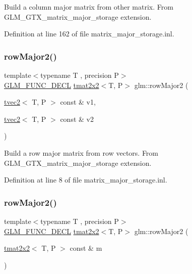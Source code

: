 Build a column major matrix from other matrix. From G\+L\+M\+\_\+\+G\+T\+X\+\_\+matrix\+\_\+major\+\_\+storage extension. 

Definition at line 162 of file matrix\+\_\+major\+\_\+storage.\+inl.

\mbox{\label{group__gtx__matrix__major__storage_ga0c7f4d56a85865f0002127119ab7d551}} 
\subsubsection{\texorpdfstring{rowMajor2()}{rowMajor2()}\hspace{0.1cm}{\footnotesize\ttfamily [1/2]}}
{\footnotesize\ttfamily template$<$typename T , precision P$>$ \\
\mbox{\hyperlink{setup_8hpp_ab2d052de21a70539923e9bcbf6e83a51}{G\+L\+M\+\_\+\+F\+U\+N\+C\+\_\+\+D\+E\+CL}} \mbox{\hyperlink{structglm_1_1tmat2x2}{tmat2x2}}$<$T, P$>$ glm\+::row\+Major2 (\begin{DoxyParamCaption}\item[{\mbox{\hyperlink{structglm_1_1tvec2}{tvec2}}$<$ T, P $>$ const \&}]{v1,  }\item[{\mbox{\hyperlink{structglm_1_1tvec2}{tvec2}}$<$ T, P $>$ const \&}]{v2 }\end{DoxyParamCaption})}

Build a row major matrix from row vectors. From G\+L\+M\+\_\+\+G\+T\+X\+\_\+matrix\+\_\+major\+\_\+storage extension. 

Definition at line 8 of file matrix\+\_\+major\+\_\+storage.\+inl.

\mbox{\label{group__gtx__matrix__major__storage_ga42a006aa66198452bd3c89415f892196}} 
\subsubsection{\texorpdfstring{rowMajor2()}{rowMajor2()}\hspace{0.1cm}{\footnotesize\ttfamily [2/2]}}
{\footnotesize\ttfamily template$<$typename T , precision P$>$ \\
\mbox{\hyperlink{setup_8hpp_ab2d052de21a70539923e9bcbf6e83a51}{G\+L\+M\+\_\+\+F\+U\+N\+C\+\_\+\+D\+E\+CL}} \mbox{\hyperlink{structglm_1_1tmat2x2}{tmat2x2}}$<$T, P$>$ glm\+::row\+Major2 (\begin{DoxyParamCaption}\item[{\mbox{\hyperlink{structglm_1_1tmat2x2}{tmat2x2}}$<$ T, P $>$ const \&}]{m }\end{DoxyParamCaption})}

